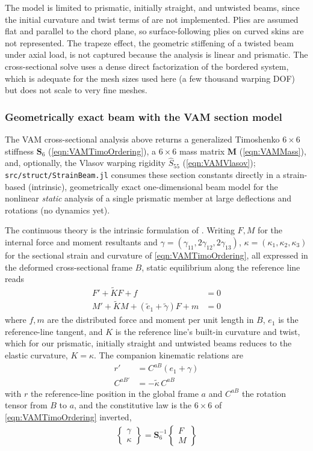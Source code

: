 \documentclass[10pt]{article}
\newcommand{\mbf}[1]{\mathbf{#1}}
\newcommand{\beq}{\begin{equation}\begin{aligned}}
\newcommand{\eeq}{\end{aligned}\end{equation}}
\begin{document}
The model is limited to prismatic, initially straight, and untwisted beams, since the initial curvature and twist terms of \citet{Hodges2006} are not implemented.
Plies are assumed flat and parallel to the chord plane, so surface-following plies on curved skins are not represented.
The trapeze effect, the geometric stiffening of a twisted beam under axial load, is not captured because the analysis is linear and prismatic.
The cross-sectional solve uses a dense direct factorization of the bordered system, which is adequate for the mesh sizes used here (a few thousand warping \ac{DOF}) but does not scale to very fine meshes.
%
\subsubsection{Geometrically exact beam with the VAM section model}
%
The \ac{VAM} cross-sectional analysis above returns a generalized Timoshenko $6\times6$ stiffness $\mbf{S}_6$ (\autoref{eqn:VAMTimoOrdering}), a $6\times6$ mass matrix $\mbf{M}$ (\autoref{eqn:VAMMass}), and, optionally, the Vlasov warping rigidity $\hat S_{55}$ (\autoref{eqn:VAMVlasov}); \texttt{src/struct/StrainBeam.jl} consumes these section constants directly in a strain-based (intrinsic), geometrically exact one-dimensional beam model for the nonlinear \emph{static} analysis of a single prismatic member at large deflections and rotations (no dynamics yet).

The continuous theory is the intrinsic formulation of \citet[Ch.~5]{Hodges2006}.
Writing $F, M$ for the internal force and moment resultants and $\gamma = (\gamma_{11}, 2\gamma_{12}, 2\gamma_{13})$, $\kappa = (\kappa_1,\kappa_2,\kappa_3)$ for the sectional strain and curvature of \autoref{eqn:VAMTimoOrdering}, all expressed in the deformed cross-sectional frame $B$, static equilibrium along the reference line reads
\beq
F' + \tilde K F + f &= 0 \\
M' + \tilde K M + (\tilde e_1 + \tilde\gamma) F + m &= 0
\label{eqn:StrainBeamEquilibrium}
\eeq
where $f, m$ are the distributed force and moment per unit length in $B$, $e_1$ is the reference-line tangent, and $K$ is the reference line's built-in curvature and twist, which for our prismatic, initially straight and untwisted beams reduces to the elastic curvature, $K=\kappa$.
The companion kinematic relations are
\beq
r' &= C^{aB}(e_1+\gamma) \\
C^{aB\prime} &= -\tilde\kappa\, C^{aB}
\label{eqn:StrainBeamKinematics}
\eeq
with $r$ the reference-line position in the global frame $a$ and $C^{aB}$ the rotation tensor from $B$ to $a$, and the constitutive law is the $6\times6$ of \autoref{eqn:VAMTimoOrdering} inverted,
\beq
\begin{Bmatrix}\gamma \\ \kappa\end{Bmatrix} = \mbf{S}_6^{-1}\begin{Bmatrix}F \\ M\end{Bmatrix}
\label{eqn:StrainBeamConstitutive}
\eeq
\end{document}
